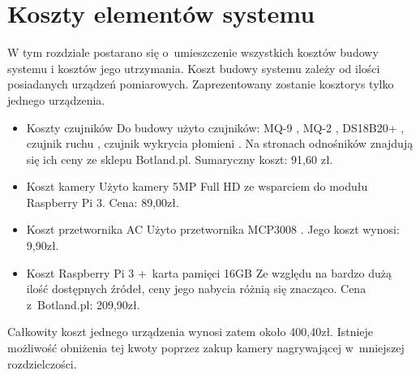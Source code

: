 \documentclass[polish,bachelor,a4paper,oneside]{ppfcmthesis}
\begin{document}
    \section{Koszty elementów systemu}
    W tym rozdziale postarano się o~umieszczenie wszystkich kosztów budowy systemu i kosztów jego utrzymania. Koszt budowy systemu zależy od ilości posiadanych urządzeń pomiarowych. Zaprezentowany zostanie kosztorys tylko jednego urządzenia.
    \begin{itemize}
        \item Koszty czujników \newline
        Do budowy użyto czujników: MQ-9 \cite{specyfikacjaMQ-9}, MQ-2 \cite{specyfikacjaMQ-2}, DS18B20+ \cite{specyfikacjaTemp}, czujnik ruchu \cite{pir}, czujnik wykrycia płomieni \cite {specyfikacjaFlame}. Na stronach odnośników znajdują się ich ceny ze sklepu Botland.pl. Sumaryczny koszt: 91,60 zł.
        \item Koszt kamery \newline
        Użyto kamery 5MP Full HD ze wsparciem do modułu Raspberry Pi 3. Cena: 89,00zł.
        \item Koszt przetwornika AC \newline
        Użyto przetwornika MCP3008 \cite{specyfikacjaAC}. Jego koszt wynosi: 9,90zł.
        \item Koszt Raspberry Pi 3 +~karta pamięci 16GB \newline
        Ze względu na bardzo dużą ilość dostępnych źródeł, ceny jego nabycia różnią się znacząco. Cena z~Botland.pl: 209,90zł.
    \end{itemize}
    Całkowity koszt jednego urządzenia wynosi zatem około 400,40zł. Istnieje możliwość obniżenia tej kwoty poprzez zakup kamery nagrywającej w~mniejszej rozdzielczości.
\end{document}
